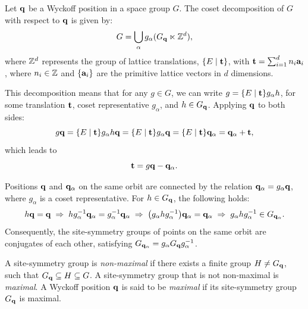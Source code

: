 \begin{lemma} \label{lemma:cosetdecomp_wyckoff}
Let \( {\vb{q}} \) be a Wyckoff position in a space group \( G \). The coset decomposition of \( G \) with respect to \( {\vb{q}} \) is given by:
\begin{equation} \label{eq:coset_decomp_wyckoff}
G = \bigcup_\alpha g_\alpha (G_{{\vb{q}}} \ltimes {\mathbb{Z}}^d),
\end{equation}
where \( {\mathbb{Z}}^d \) represents the group of lattice translations, \(\{E\mid {\vb{t}}\}\), with \({\vb{t}} = \sum_{i=1}^d n_i {\vb{a}}_i\), where \( n_i \in {\mathbb{Z}} \) and \(\{{\vb{a}}_i\}\) are the primitive lattice vectors in \( d \) dimensions.

This decomposition means that for any \( g \in G \), we can write \( g = \{E \mid {\vb{t}}\} g_\alpha h \), for some translation \({\vb{t}}\), coset representative \( g_\alpha \), and \( h \in G_{\vb{q}} \). Applying \( {\vb{q}} \) to both sides:
\begin{equation} \label{eq:coset_decomp_translation_t_step1}
g {\vb{q}} = \{E \mid {\vb{t}}\} g_\alpha h {\vb{q}} = \{E \mid {\vb{t}}\} g_\alpha {\vb{q}} = \{E \mid {\vb{t}}\} {\vb{q}}_\alpha = {\vb{q}}_\alpha + {\vb{t}},
\end{equation}
which leads to
\begin{equation} \label{eq:coset_decomp_translation_t}
{\vb{t}} = g {\vb{q}} - {\vb{q}}_\alpha.
\end{equation}
\end{lemma}

\begin{lemma} \label{lemma:conjugate_group_G_qalpha}
Positions \({\vb{q}}\) and \({\vb{q}}_\alpha\) on the same orbit are connected by the relation \({\vb{q}}_\alpha = g_\alpha {\vb{q}}\), where \(g_\alpha\) is a coset representative. For \(h \in G_{\vb{q}}\), the following holds:
\begin{equation} \label{eq:conjugate_group_qalpha}
h {\vb{q}} = {\vb{q}} \; \Rightarrow \; h g_\alpha^{-1} {\vb{q}}_\alpha = g_\alpha^{-1} {\vb{q}}_\alpha \; \Rightarrow \;
\qty(g_\alpha h g_\alpha^{-1}) {\vb{q}}_\alpha = {\vb{q}}_\alpha \; \Rightarrow \;
g_\alpha h g_\alpha^{-1} \in G_{{\vb{q}}_\alpha}.
\end{equation}
Consequently, the site-symmetry groups of points on the same orbit are conjugates of each other, satisfying \(G_{{\vb{q}}_\alpha} = g_\alpha G_{\vb{q}} g_\alpha^{-1}\).
\end{lemma}


\begin{definition} \label{def:maximal_wyckpos}
A site-symmetry group is \textit{non-maximal} if there exists a finite group $H \neq G_{\vb{q}}$, such that $G_{\vb{q}} \subseteq H \subseteq G$. A site-symmetry group that is not non-maximal is \textit{maximal}. A Wyckoff position ${\vb{q}}$ is said to be \textit{maximal} if its site-symmetry group $G_{\vb{q}}$ is maximal.
\end{definition}

